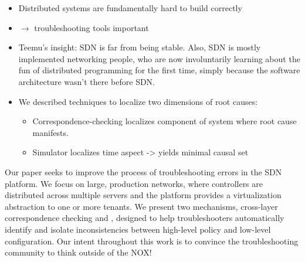 \begin{itemize}
\item Distributed systems are fundamentally hard to build correctly 
\item $\rightarrow$ troubleshooting tools important
\item Teemu’s insight: SDN is far from being stable. Also, SDN is mostly implemented
networking people, who are now involuntarily learning about the fun of
distributed programming for the first time, simply because the software
architecture wasn’t there before SDN.
\item We described techniques to localize two dimensions of root causes:
    \begin{itemize}
    \item Correspondence-checking localizes component of system where root cause
    manifests. 
    \item Simulator localizes time aspect -> yields minimal causal set
    \end{itemize}
\end{itemize}

Our paper seeks to improve the process of troubleshooting errors in the SDN
platform. We focus on large, production networks, 
where controllers are distributed across multiple servers
and the platform provides a virtualization abstraction to one or more tenants.
We present two mechanisms, cross-layer correspondence checking
and \simulator{}, designed to help troubleshooters automatically identify
and isolate inconsistencies between high-level policy and low-level
configuration. Our intent throughout this work is to convince
the troubleshooting community to think outside of the NOX!
